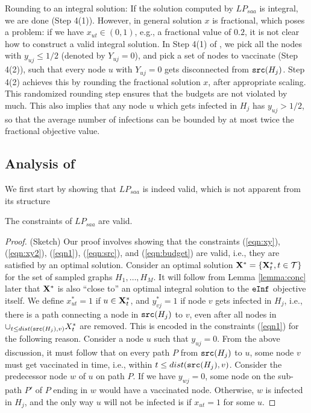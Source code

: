 \begin{itemize}
Rounding to an integral solution:
If the solution computed by $LP_{saa}$ is integral, we are done (Step 4(1)).
However, in general solution $x$ is fractional, which poses a problem:
if we have $x_{ut}\in(0, 1)$, e.g., a fractional value of $0.2$, it is not clear how to construct
a valid integral solution. In Step 4(1) of \algo{}, we pick all the nodes with $y_{uj}\leq 1/2$ (denoted by $Y_{uj}=0$),
and pick a set of nodes to vaccinate (Step 4(2)), such that every node $u$ with $Y_{uj}=0$ gets disconnected from $\texttt{src}(H_j)$.
Step 4(2) achieves this by rounding the fractional solution $x$, after appropriate scaling.
This randomized rounding step ensures that the budgets are not violated by much.
This also implies that any node $u$ which gets infected in $H_j$ has $y_{uj}>1/2$, so that the average number
of infections can be bounded by at most twice the fractional objective value.
\end{itemize}

\subsection{Analysis of \algo{}}

We first start by showing that $LP_{saa}$ is indeed valid, which is not apparent from its structure

\begin{lemma}
The constraints of $LP_{saa}$ are valid.
\end{lemma}
\begin{proof} (Sketch)
Our proof involves showing that the constraints (\ref{eqn:xy}), (\ref{eqn:xy2}), (\ref{eqn1}),
(\ref{eqn:src}), and (\ref{eqn:budget}) are valid, i.e., they are satisfied by an optimal solution.
Consider an optimal solution $\mathbf{X}^*=\{\mathbf{X}^*_t, t\in\mathcal{T}\}$ for the set of sampled graphs
$H_1,\ldots,H_M$. It will follow from Lemma \ref{lemma:conc} later that $\mathbf{X}^*$ is also ``close to''
an optimal integral solution to the $\texttt{eInf}$ objective itself.
We define $x^*_{ut}=1$ if $u\in\mathbf{X}^*_t$, and $y^*_{vj}=1$ if node $v$ gets infected in $H_j$, i.e.,
there is a path connecting a node in $\texttt{src}(H_j)$ to $v$, even after all nodes in $\cup_{t\leq dist(\texttt{src}(H_j), v)} X^*_t$ are 
removed.
This is encoded in the constraints (\ref{eqn1}) for the following reason. 
Consider a node $u$ such that $y_{uj}=0$. From the above discussion, it must follow that on every path $P$ from
$\texttt{src}(H_j)$ to $u$, some node $v$ must get vaccinated in time, i.e., within $t\leq dist(\texttt{src}(H_j), v)$.
Consider the predecessor node $w$ of $u$ on path $P$. If we have $y_{wj}=0$, some node on the sub-path $P'$ of $P$
ending in $w$ would have a vaccinated node. Otherwise, $w$ is infected in $H_j$, and the only way $u$ will not be
infected is if $x_{ut}=1$ for some $u$.
\end{proof}


